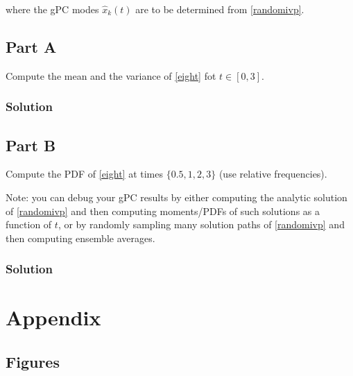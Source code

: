 \documentclass[
]{article}
\begin{document}
where the gPC modes \(\hat{x}_k(t)\) are to be determined from
\eqref{randomivp}.

\subsection{Part A}\label{part-a-2}

Compute the mean and the variance of \eqref{eight} fot \(t \in [0, 3]\).

\subsubsection{Solution}\label{solution-6}

\subsection{Part B}\label{part-b-2}

Compute the PDF of \eqref{eight} at times \(\{0.5, 1, 2, 3\}\) (use
relative frequencies).

Note: you can debug your gPC results by either computing the analytic
solution of \eqref{randomivp} and then computing moments/PDFs of such
solutions as a function of \(t\), or by randomly sampling many solution
paths of \eqref{randomivp} and then computing ensemble averages.

\subsubsection{Solution}\label{solution-7}

\section{Appendix}\label{appendix}

\subsection{Figures}\label{figures}

\begin{figure}


\caption{\label{fig-pdfxi}}

\end{figure}%
\end{document}
